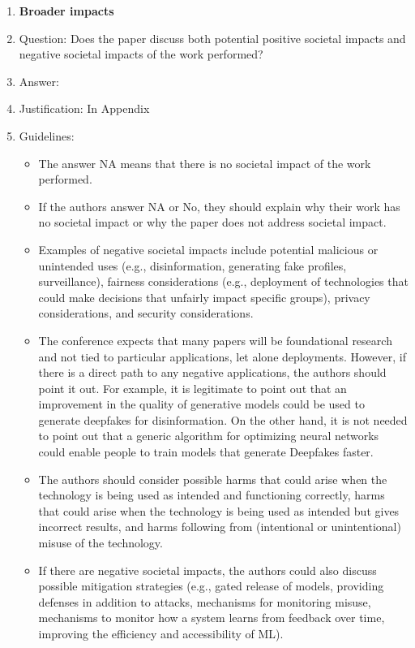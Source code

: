 \documentclass{article}
\begin{document}
\begin{enumerate}
\item {\bf Broader impacts}
    \item[] Question: Does the paper discuss both potential positive societal impacts and negative societal impacts of the work performed?
    \item[] Answer: \answerYes{} %
    \item[] Justification: In Appendix
    \item[] Guidelines:
    \begin{itemize}
        \item The answer NA means that there is no societal impact of the work performed.
        \item If the authors answer NA or No, they should explain why their work has no societal impact or why the paper does not address societal impact.
        \item Examples of negative societal impacts include potential malicious or unintended uses (e.g., disinformation, generating fake profiles, surveillance), fairness considerations (e.g., deployment of technologies that could make decisions that unfairly impact specific groups), privacy considerations, and security considerations.
        \item The conference expects that many papers will be foundational research and not tied to particular applications, let alone deployments. However, if there is a direct path to any negative applications, the authors should point it out. For example, it is legitimate to point out that an improvement in the quality of generative models could be used to generate deepfakes for disinformation. On the other hand, it is not needed to point out that a generic algorithm for optimizing neural networks could enable people to train models that generate Deepfakes faster.
        \item The authors should consider possible harms that could arise when the technology is being used as intended and functioning correctly, harms that could arise when the technology is being used as intended but gives incorrect results, and harms following from (intentional or unintentional) misuse of the technology.
        \item If there are negative societal impacts, the authors could also discuss possible mitigation strategies (e.g., gated release of models, providing defenses in addition to attacks, mechanisms for monitoring misuse, mechanisms to monitor how a system learns from feedback over time, improving the efficiency and accessibility of ML).
    \end{itemize}
    

\end{enumerate}
\end{document}

